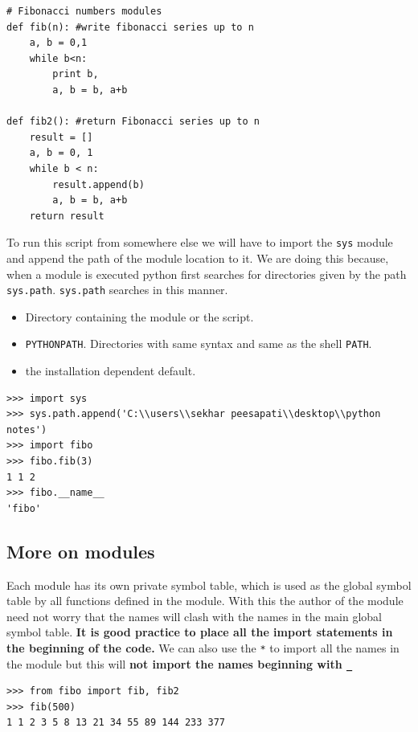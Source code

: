 \documentclass[12pt,a4paper]{article}
\begin{document}
\begin{verbatim}
# Fibonacci numbers modules
def fib(n): #write fibonacci series up to n
    a, b = 0,1
    while b<n:
        print b,
        a, b = b, a+b
    
def fib2(): #return Fibonacci series up to n
    result = []
    a, b = 0, 1
    while b < n:
        result.append(b)
        a, b = b, a+b
    return result
\end{verbatim}
To run this script from somewhere else we will have to import the \texttt{sys} module and append the path of the module location to it. We are doing this because, when a module is executed python first searches for directories given by the path \texttt{sys.path}. \texttt{sys.path} searches in this manner.
\begin{itemize}
\item Directory containing the module or the script.
\item \texttt{PYTHONPATH}. Directories with same syntax and same as the shell \texttt{PATH}.
\item the installation dependent default.
\end{itemize}

\begin{verbatim}
>>> import sys
>>> sys.path.append('C:\\users\\sekhar peesapati\\desktop\\python notes')
>>> import fibo
>>> fibo.fib(3)
1 1 2
>>> fibo.__name__
'fibo'
\end{verbatim}
\subsection{More on modules}
Each module has its own private symbol table, which is used as the global symbol table by all functions defined in the module. With this the author of the module need not worry that the names will clash with the names in the main global symbol table. \textbf{It is good practice to place all the import statements in the beginning of the code.} We can also use the \texttt{*} to import all the names in the module but this will \textbf{not import the names beginning with \texttt{\_}}

\begin{verbatim}
>>> from fibo import fib, fib2
>>> fib(500)
1 1 2 3 5 8 13 21 34 55 89 144 233 377
\end{verbatim}
\end{document}

